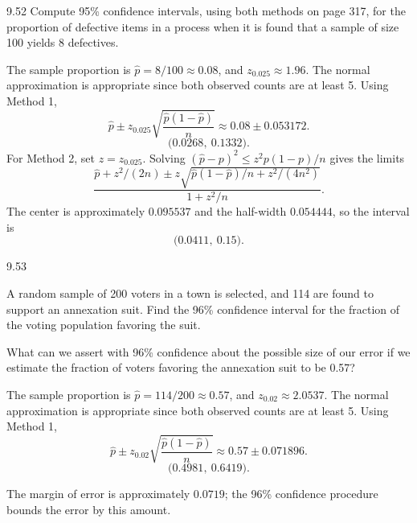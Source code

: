 \documentclass[11pt,oneside]{article}
\begin{document}
\begin{exercise}{9.52}
Compute 95\% confidence intervals, using both methods on page 317, for the proportion of defective items in a process when it is found that a sample of size 100 yields 8 defectives.
\end{exercise}
\begin{solution}
The sample proportion is $\hat p=8/100\approx0.08$, and $z_{0.025}\approx1.96$. The normal approximation is appropriate since both observed counts are at least 5. Using Method 1,
\[
\hat p\pm z_{0.025}\sqrt{\frac{\hat p(1-\hat p)}{n}}\approx0.08\pm 0.053172.
\]
\[
\boxed{\bigl(0.0268,\ 0.1332\bigr)}.
\]
For Method 2, set $z=z_{0.025}$. Solving $(\hat p-p)^2\le z^2p(1-p)/n$ gives the limits
\[
\frac{\hat p+z^2/(2n)\pm z\sqrt{\hat p(1-\hat p)/n+z^2/(4n^2)}}{1+z^2/n}.
\]
The center is approximately $0.095537$ and the half-width $0.054444$, so the interval is
\[
\boxed{\bigl(0.0411,\ 0.15\bigr)}.
\]
\end{solution}

\begin{exercise}{9.53}
\begin{exercisesubparts}
\item A random sample of 200 voters in a town is selected, and 114 are found to support an annexation suit. Find the 96\% confidence interval for the fraction of the voting population favoring the suit.
\item What can we assert with 96\% confidence about the possible size of our error if we estimate the fraction of voters favoring the annexation suit to be 0.57?
\end{exercisesubparts}
\end{exercise}
\begin{solution}
\begin{exercisesubparts}
\item The sample proportion is $\hat p=114/200\approx0.57$, and $z_{0.02}\approx2.0537$. The normal approximation is appropriate since both observed counts are at least 5. Using Method 1,
\[
\hat p\pm z_{0.02}\sqrt{\frac{\hat p(1-\hat p)}{n}}\approx0.57\pm 0.071896.
\]
\[
\boxed{\bigl(0.4981,\ 0.6419\bigr)}.
\]

\item The margin of error is approximately $\boxed{0.0719}$; the 96\% confidence procedure bounds the error by this amount.
\end{exercisesubparts}
\end{solution}
\end{document}
